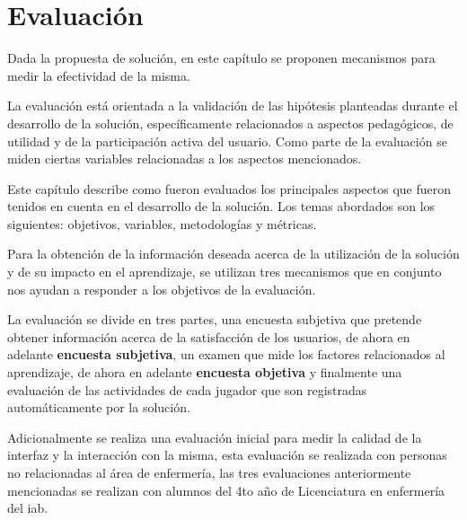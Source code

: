 
\chapter{Evaluación}

Dada la propuesta de solución, en este capítulo se proponen mecanismos para medir la
efectividad de la misma.

La evaluación está orientada a la validación de las hipótesis planteadas durante
el desarrollo de la solución, específicamente relacionados a aspectos
pedagógicos, de utilidad y de la participación activa del usuario. Como parte de
la evaluación se miden ciertas variables relacionadas a los aspectos
mencionados.

Este capítulo describe como fueron evaluados los principales aspectos que fueron
tenidos en cuenta en el desarrollo de la solución. Los temas abordados son los
siguientes: objetivos, variables, metodologías y métricas. 

Para la obtención de la información deseada acerca de la utilización de la
solución y de su impacto en el aprendizaje, se utilizan tres mecanismos que en
conjunto nos ayudan a responder a los objetivos de la evaluación.

La evaluación se divide en tres partes, una encuesta subjetiva que pretende
obtener información acerca de la satisfacción de los usuarios, de ahora en
adelante \textbf{encuesta subjetiva}, un examen que mide los factores
relacionados al aprendizaje, de ahora en adelante \textbf{encuesta objetiva}  y
finalmente una evaluación de las actividades de cada jugador que son registradas
automáticamente por la solución.

Adicionalmente se realiza una evaluación inicial para medir la calidad de la
interfaz y la interacción con la misma, esta evaluación se realizada con
personas no relacionadas al área de enfermería, las tres evaluaciones
anteriormente mencionadas se realizan con alumnos del 4to año de Licenciatura en
enfermería del \Gls{iab}.







